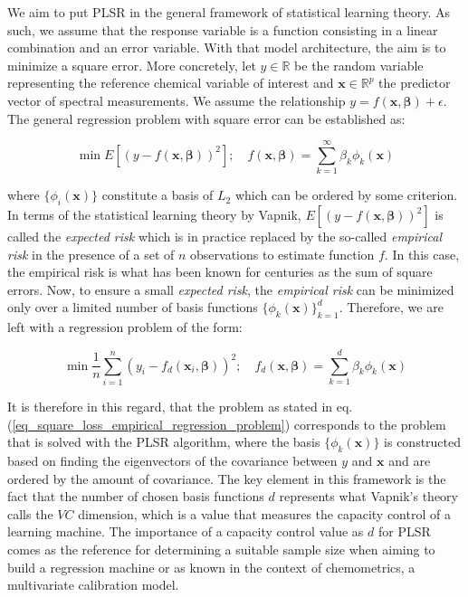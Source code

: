 \documentclass{article}
\begin{document}
We aim to put PLSR in the general framework of statistical learning theory. As such, we assume that the response variable is a function consisting in a linear combination and an error variable. With that model architecture, the aim is to minimize a square error. More concretely, let $y \in \mathbb{R}$ be the random variable representing the reference chemical variable of interest and   $\mathbf{x} \in \mathbb{R}^{p}$ the predictor vector of spectral measurements. We assume the relationship $ y = f(\mathbf{x}, \boldsymbol{\beta}) + \epsilon$.  The general regression problem with square error can be established as:

\begin{equation}
    \min E \left[ (y-f(\mathbf{x}, \boldsymbol{\beta}))^2\right]; \quad f(\mathbf{x}, \boldsymbol{\beta}) = \sum_{k=1}^{\infty} \beta_k \phi_{k}(\mathbf{x})
    \label{eq_general_regression_problem}
\end{equation}

where $\{\phi_{i}(\mathbf{x})\}$ constitute a basis of $L_2$ which can be ordered by some criterion. In terms of the statistical learning theory by Vapnik, $E \left[ (y-f(\mathbf{x}, \boldsymbol{\beta}))^2\right]$ is called the \emph{expected risk} which is in practice replaced by the so-called \emph{empirical risk} in the presence of a set of $n$ observations to estimate function $f$. In this case, the empirical risk is what has been known for centuries as the sum of square errors. Now, to ensure a small \emph{expected risk}, the \emph{empirical risk} can be minimized only over a limited number of basis functions $\{\phi_{k}(\mathbf{x})\}_{k=1}^d$. Therefore, we are left with a regression problem of the form:

\begin{equation}
    \min \frac{1}{n} \sum_{i=1}^n (y_i-f_d(\mathbf{x}_i, \boldsymbol{\beta}))^2; \quad f_d(\mathbf{x}, \boldsymbol{\beta}) = \sum_{k=1}^{d} \beta_k \phi_{k}(\mathbf{x})
    \label{eq_square_loss_empirical_regression_problem}
\end{equation}

It is therefore in this regard, that the problem as stated in eq. (\ref{eq_square_loss_empirical_regression_problem}) corresponds to the problem that is solved with the PLSR algorithm, where the basis $\{\phi_{k}(\mathbf{x})\}$ is constructed based on finding the eigenvectors of the covariance between $y$ and $\mathbf{x}$ and are ordered by the amount of covariance. The key element in this framework is the fact that the number of chosen basis functions $d$ represents what Vapnik's theory calls the $VC$ dimension, which is a value that measures the capacity control of a learning machine. The importance of a capacity control value as $d$ for PLSR comes as the reference for determining a suitable sample size when aiming to build a regression machine or as known in the context of chemometrics, a multivariate calibration model. 
\end{document}
